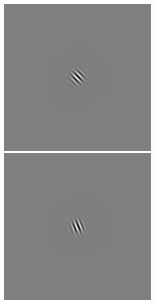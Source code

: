 \begin{figure}[ht]
\begin{center}
 \includegraphics[width=\columnwidth/9]{ch4/figures/rGabor1_6.jpg}
 \includegraphics[width=\columnwidth/9]{ch4/figures/rGabor1_7.jpg}\\

\end{center}
\end{figure}
